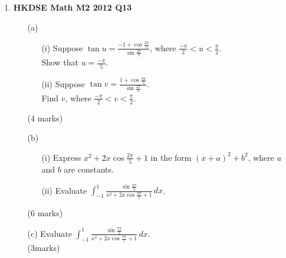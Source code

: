 \documentclass{report}
\begin{document}
\begin{enumerate}
	\item \textbf{HKDSE Math M2 2012 Q13}
	\begin{enumerate}
		\item [(a)]
		\begin{enumerate}
			\item [(i)]Suppose $\tan{u} = \displaystyle\frac{-1 + \cos{\displaystyle\frac{2\pi}{5}}}{\sin{\displaystyle\frac{2\pi}{5}}}$, where $\displaystyle\frac{-\pi}{2} < u < \frac{\pi}{2}$. \\
			Show that $u = \displaystyle\frac{-\pi}{5}$. 
			\item [(ii)]Suppose $\tan{v} = \displaystyle\frac{1+\cos{\displaystyle\frac{2\pi}{5}}}{\sin{\displaystyle\frac{2\pi}{5}}}$. \\
			Find $v$, where $\displaystyle\frac{-\pi}{2} < v < \frac{\pi}{2}$.
		\end{enumerate}
		(4 marks)
		\item[(b)]
		\begin{enumerate}
			\item[(i)]Express $x^2 + 2x\cos{\displaystyle\frac{2\pi}{5}} + 1$ in the form $(x+a)^2 + b^2$, where $a$ and $b$ are constants. 
			\item[(ii)]Evaluate $\displaystyle\int_{-1}^{1}\frac{\sin{\displaystyle\frac{2\pi}{5}}}{x^2 + 2x\cos{\displaystyle\frac{2\pi}{5}}+1}\, dx$.
		\end{enumerate}
		(6 marks)
		\item[(c)]Evaluate $\displaystyle\int_{-1}^{1}\frac{\sin{\displaystyle\frac{7\pi}{5}}}{x^2 + 2x\cos{\displaystyle\frac{7\pi}{5}}+1} \,dx$. \\(3marks)
	\end{enumerate}

	\newpage


\end{enumerate}
\end{document}
